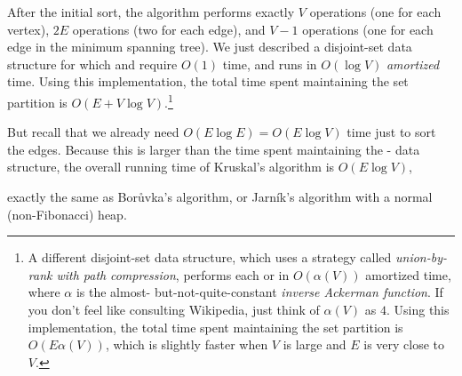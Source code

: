 After the initial sort, the algorithm performs exactly $V$  operations (one for each vertex), $2E$  operations (two for each edge), and $V -1$  operations (one for each edge in the minimum spanning tree). We just described a disjoint-set data structure for which  and  require $O(1)$ time, and  runs in $O(\log  V)$ \textit{amortized} time. Using this implementation, the total time spent maintaining the set partition is $O(E + V \log  V)$.\footnote{A different disjoint-set data structure, which uses a strategy called \textit{union-by-rank with path} \textit{compression}, performs each  or  in $O(\alpha (V))$ amortized time, where $\alpha$ is the almost- but-not-quite-constant \textit{inverse Ackerman function}. If you don’t feel like consulting Wikipedia, just think of $\alpha (V)$ as $4$. Using this implementation, the total time spent maintaining the set partition is $O(E\alpha (V))$, which is slightly faster when $V$ is large and $E$ is very close to $V$.}

But recall that we already need $O(E \log  E) = O(E \log  V)$ time just to sort the edges. Because this is larger than the time spent maintaining the - data structure, the overall running time of Kruskal’s algorithm is $O(E \log  V)$,

exactly the same as Borůvka’s algorithm, or Jarník’s algorithm with a normal (non-Fibonacci) heap.

